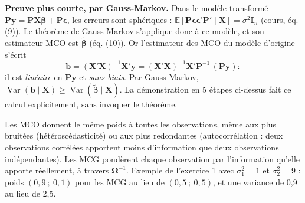 \documentclass[11pt,a4paper]{article}
\newcommand{\vy}{\mathbf{y}}\newcommand{\vX}{\mathbf{X}}\newcommand{\vb}{\mathbf{b}}\newcommand{\vc}{\mathbf{c}}
\newcommand{\veps}{\bm{\epsilon}}\newcommand{\vbeta}{\bm{\beta}}\newcommand{\tbeta}{\tilde{\bm{\beta}}}
\newcommand{\I}{\mathbf{I}}\newcommand{\Pm}{\mathbf{P}}\newcommand{\Om}{\bm{\Omega}}
\newcommand{\Var}{\operatorname{Var}}\newcommand{\E}{\mathbb{E}}
\begin{document}
\textbf{Preuve plus courte, par Gauss-Markov.} Dans le modèle transformé $\Pm\vy=\Pm\vX\vbeta+\Pm\veps$, les erreurs sont sphériques : $\E[\Pm\veps\veps'\Pm'\mid\vX]=\sigma^2\I_n$ (cours, éq. (9)). Le théorème de Gauss-Markov s'applique donc à ce modèle, et son estimateur MCO est $\tbeta$ (éq. (10)). Or l'estimateur des MCO du modèle d'origine s'écrit
\[
\vb=(\vX'\vX)^{-1}\vX'\vy=(\vX'\vX)^{-1}\vX'\Pm^{-1}\,(\Pm\vy) :
\]
il est \emph{linéaire} en $\Pm\vy$ et \emph{sans biais}. Par Gauss-Markov, $\Var(\vb\mid\vX)\ge\Var(\tbeta\mid\vX)$. La démonstration en 5 étapes ci-dessus fait ce calcul explicitement, sans invoquer le théorème.

\begin{intuition}
Les MCO donnent le même poids à toutes les observations, même aux plus bruitées (hétéroscédasticité) ou aux plus redondantes (autocorrélation : deux observations corrélées apportent moins d'information que deux observations indépendantes). Les MCG pondèrent chaque observation par l'information qu'elle apporte réellement, à travers $\Om^{-1}$. Exemple de l'exercice 1 avec $\sigma_1^2=1$ et $\sigma_2^2=9$ : poids $(0{,}9\ ;\ 0{,}1)$ pour les MCG au lieu de $(0{,}5\ ;\ 0{,}5)$, et une variance de 0,9 au lieu de 2,5.
\end{intuition}
\end{document}

